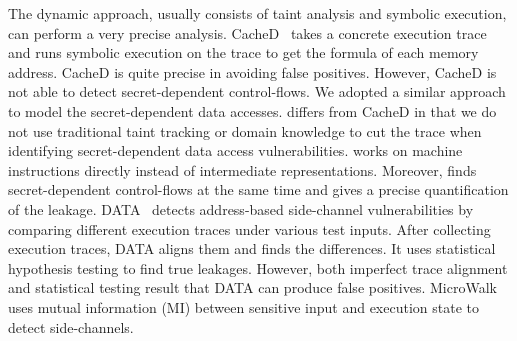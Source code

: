 The dynamic approach, usually consists of taint analysis and symbolic execution,
can perform a very precise analysis. CacheD~\cite{203878} takes a concrete execution trace and runs symbolic execution on the trace
to get the formula of each memory address. CacheD is
quite precise in avoiding false positives. However, CacheD is not able to detect secret-dependent control-flows. We adopted a similar approach to model the secret-dependent data accesses. \tool{} differs from CacheD in that we do not use traditional taint tracking or domain knowledge to cut the trace when identifying secret-dependent data access vulnerabilities. \tool{} works on machine instructions directly instead of intermediate representations. Moreover, \tool{} finds secret-dependent control-flows at the same time and gives a precise quantification of the leakage. DATA~\cite{217537} detects address-based side-channel vulnerabilities by comparing different execution traces under various test inputs. After collecting execution traces, DATA aligns them and finds the differences. It uses statistical hypothesis testing to find true leakages. However, both imperfect trace alignment and statistical testing result that DATA can produce false positives.
MicroWalk~\cite{Wichelmann:2018:MFF:3274694.3274741} uses
mutual information (MI) between sensitive input and execution state to detect side-channels. 

